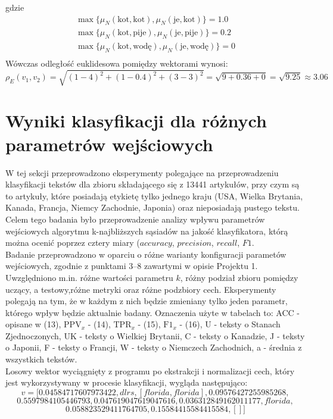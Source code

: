 \documentclass{article}
\begin{document}
gdzie
\[
\begin{aligned}
\max \{\mu_N(\text{kot}, \text{kot}), \mu_N(\text{je}, \text{kot})\} = 1.0 \\
\max \{\mu_N(\text{kot}, \text{pije}), \mu_N(\text{je}, \text{pije})\} = 0.2 \\
\max \{\mu_N(\text{kot}, \text{wodę}), \mu_N(\text{je}, \text{wodę})\} = 0 \\
\end{aligned}
\]
Wówczas odległość euklidesowa pomiędzy wektorami wynosi:
\[
\rho_E(v_1, v_2) = \sqrt{(1 - 4)^2 + (1 - 0.4)^2 + (3 - 3)^2} = \sqrt{9 + 0.36 + 0} = \sqrt{9.25} \approx 3.06
\]

\section{Wyniki klasyfikacji dla różnych parametrów wejściowych}
W tej sekcji przeprowadzono eksperymenty polegające na przeprowadzeniu klasyfikacji tekstów dla zbioru składającego się z 13441 artykułów, przy czym są to artykuły, które posiadają etykietę tylko jednego kraju (USA, Wielka Brytania, Kanada, Francja, Niemcy Zachodnie, Japonia) oraz nieposiadają pustego tekstu. Celem tego badania było przeprowadzenie analizy wpływu parametrów wejściowych algorytmu k-najbliższych sąsiadów na jakość klasyfikatora, którą można ocenić poprzez cztery miary (\(accuracy\), \(precision\), \(recall\), \(F1\). \\
Badanie przeprowadzono w oparciu o różne warianty konfiguracji parametów wejściowych, zgodnie z punktami 3–8 zawartymi w opisie Projektu 1. Uwzględniono m.in. różne wartości parametru \(k\), różny podział zbioru pomiędzy uczący, a testowy,różne metryki oraz różne podzbiory cech. Eksperymenty polegają na tym, że w każdym z nich będzie zmieniany tylko jeden parametr, którego wpływ będzie aktualnie badany.
Oznaczenia użyte w tabelach to: ACC - opisane w (13),  \( \text{PPV}_x \) - (14), \( \text{TPR}_x \) - (15), \( \text{F1}_x \) - (16), U - teksty o Stanach Zjednoczonych, UK - teksty o Wielkiej Brytanii, C - teksty o Kanadzie, J - teksty o Japonii, F - teksty o Francji, W - teksty o Niemczech Zachodnich, a - średnia z wszystkich tekstów.
\\
Losowy wektor wyciągnięty z programu po ekstrakcji i normalizacji cech, który jest wykorzystywany w procesie klasyfikacji, wygląda następująco:
\[
    v = [ 0.04584717607973422, dlrs, [ florida, florida], 0.09576427255985268,
\]
\[
     0.5597984105446793, 0.047619047619047616, 0.036312849162011177, florida,
\]
\[
     0.058823529411764705, 0.15584415584415584, [] ]
\]
\end{document}
